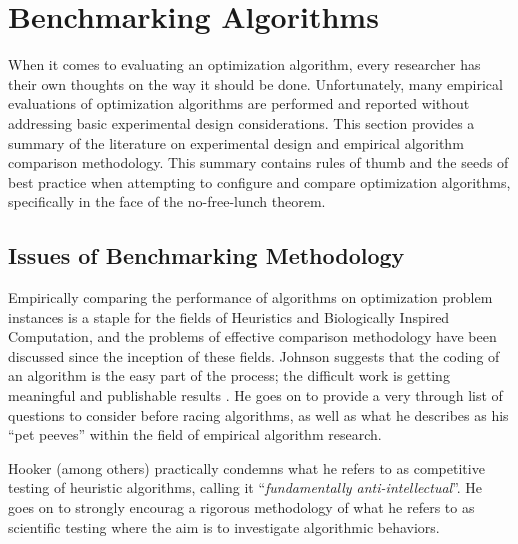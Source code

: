 
\section{Benchmarking Algorithms} 
\label{advanced:sec:racing_algorithms}

When it comes to evaluating an optimization algorithm, every researcher has their own thoughts on the way it should be done. Unfortunately, many empirical evaluations of optimization algorithms are performed and reported without addressing basic experimental design considerations. This section provides a summary of the literature on experimental design and empirical algorithm comparison methodology. This summary contains rules of thumb and the seeds of best practice when attempting to configure and compare optimization algorithms, specifically in the face of the no-free-lunch theorem.

% 
% 
\subsection{Issues of Benchmarking Methodology}
Empirically	comparing	the	performance	of algorithms on optimization problem instances is a staple for the fields of Heuristics and Biologically Inspired Computation, and the problems of effective comparison methodology have been discussed since the inception of these fields. Johnson suggests that the coding of an algorithm is the easy part of the process; the difficult work is getting meaningful and publishable results \cite{Johnson2002a}. He goes on to provide a very through list of questions to consider before racing algorithms, as well as what he describes as his ``pet peeves'' within the field of empirical algorithm research.

Hooker \cite{Hooker1995} (among others) practically condemns what he refers to as competitive testing of heuristic algorithms, calling it ``\emph{fundamentally anti-intellectual}''. He goes on to strongly encourag a rigorous methodology of what he refers to as scientific testing where the aim is to investigate algorithmic behaviors. 

